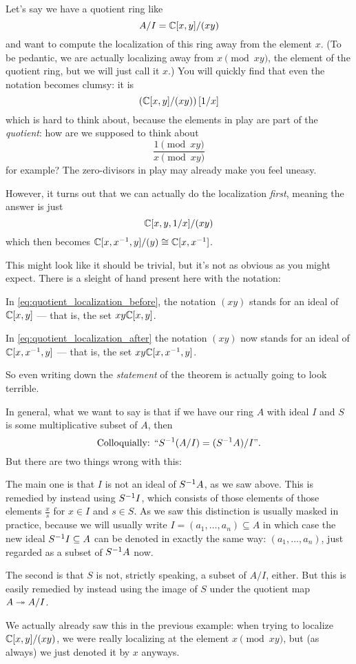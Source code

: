 Let's say we have a quotient ring like
\[ A/I = \mathbb C[x,y] / (xy) \]
and want to compute the localization of this ring
away from the element $x$.
(To be pedantic, we are actually localizing away from $x \pmod{xy}$,
the element of the quotient ring, but we will just call it $x$.)
You will quickly find that even the notation becomes clumsy: it is
\begin{equation}
	\left( \mathbb C[x,y] / (xy) \right)[1/x]
	\label{eq:quotient_localization_before}
\end{equation}
which is hard to think about,
because the elements in play are part of the \emph{quotient}:
how are we supposed to think about
\[ \frac{1 \pmod{xy}}{x \pmod{xy}} \]
for example?
The zero-divisors in play may already make you feel uneasy.

However, it turns out that we can actually do the localization
\emph{first}, meaning the answer is just
\begin{equation}
	\mathbb C[x,y,1/x] / (xy)
	\label{eq:quotient_localization_after}
\end{equation}
which then becomes $\mathbb C[x, x^{-1}, y] / (y) \cong \mathbb C[x,x^{-1}]$.

This might look like it should be trivial,
but it's not as obvious as you might expect.
There is a sleight of hand present here with the notation:
\begin{itemize}
	\ii In \eqref{eq:quotient_localization_before},
	the notation $(xy)$ stands for an ideal of $\mathbb C[x,y]$
	--- that is, the set $xy \mathbb C[x,y]$.

	\ii In \eqref{eq:quotient_localization_after}
	the notation $(xy)$ now stands for an ideal of $\mathbb C[x,x^{-1},y]$
	--- that is, the set $xy \mathbb C[x,x^{-1},y]$.
\end{itemize}
So even writing down the \emph{statement} of the theorem
is actually going to look terrible.

In general, what we want to say is that if we have our ring $A$
with ideal $I$ and $S$ is some multiplicative subset of $A$,
then \[ \text{Colloquially: ``}S^{-1} (A/I) = (S^{-1} A)/I\text{''}. \]
But there are two things wrong with this:
\begin{itemize}
\ii The main one is that $I$ is not an ideal of $S^{-1} A$, as we saw above.
This is remedied by instead using $S^{-1} I$,
which consists of those elements of those elements $\frac xs$
for $x \in I$ and $s \in S$.
As we saw this distinction is usually masked in practice,
because we will usually write $I = (a_1, \dots, a_n) \subseteq A$
in which case the new ideal $S^{-1} I \subseteq A$ can be denoted
in exactly the same way: $(a_1, \dots, a_n)$,
just regarded as a subset of $S^{-1} A$ now.

\ii The second is that $S$ is not, strictly speaking,
a subset of $A/I$, either.
But this is easily remedied by instead using the image of $S$
under the quotient map $A \twoheadrightarrow A/I$.

We actually already saw this in the previous example:
when trying to localize $\mathbb C[x,y]/(xy)$,
we were really localizing at the element $x \pmod{xy}$,
but (as always) we just denoted it by $x$ anyways.
\end{itemize}

